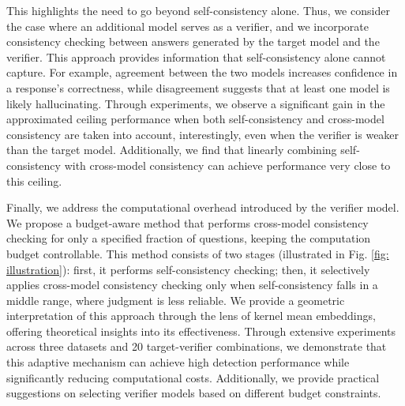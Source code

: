 This highlights the need to go beyond self-consistency alone. Thus, we consider the case where an additional model serves as a verifier, and we incorporate consistency checking between answers generated by the target model and the verifier. This approach provides information that self-consistency alone cannot capture. For example, agreement between the two models increases confidence in a response's correctness, while disagreement suggests that at least one model is likely hallucinating. Through experiments, we observe a significant gain in the approximated ceiling performance when both self-consistency and cross-model consistency are taken into account, interestingly, even when the verifier is weaker than the target model. Additionally, we find that linearly combining self-consistency with cross-model consistency can achieve performance very close to this ceiling.

Finally, we address the computational overhead introduced by the verifier model. We propose a budget-aware method that performs cross-model consistency checking for only a specified fraction of questions, keeping the computation budget controllable. This method consists of two stages (illustrated in Fig. \ref{fig: illustration}): first, it performs self-consistency checking; then, it selectively applies cross-model consistency checking only when self-consistency falls in a middle range, where judgment is less reliable. We provide a geometric interpretation of this approach through the lens of kernel mean embeddings, offering theoretical insights into its effectiveness. Through extensive experiments across three datasets and 20 target-verifier combinations, we demonstrate that this adaptive mechanism can achieve high detection performance while significantly reducing computational costs. Additionally, we provide practical suggestions on selecting verifier models based on different budget constraints.


